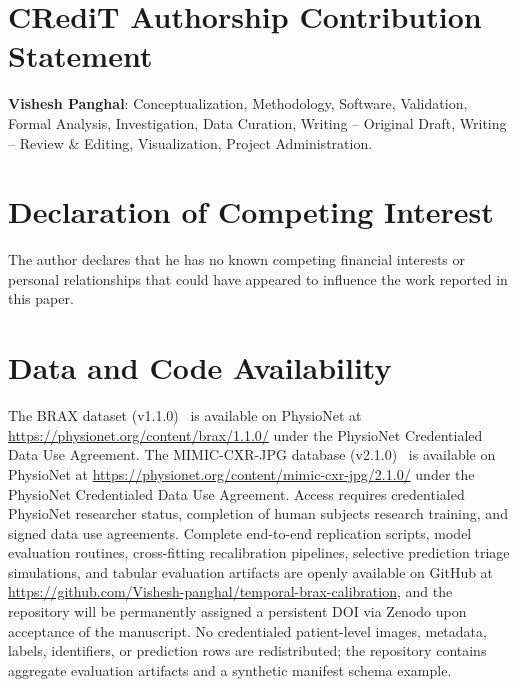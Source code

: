 \documentclass[preprint,12pt]{elsarticle}
\begin{document}
\section*{CRediT Authorship Contribution Statement}
\textbf{Vishesh Panghal}: Conceptualization, Methodology, Software, Validation, Formal Analysis, Investigation, Data Curation, Writing -- Original Draft, Writing -- Review \& Editing, Visualization, Project Administration.

\section*{Declaration of Competing Interest}
The author declares that he has no known competing financial interests or personal relationships that could have appeared to influence the work reported in this paper.

\section*{Data and Code Availability}
The BRAX dataset (v1.1.0)~\cite{reis2022brax} is available on PhysioNet at \url{https://physionet.org/content/brax/1.1.0/} under the PhysioNet Credentialed Data Use Agreement. The MIMIC-CXR-JPG database (v2.1.0)~\cite{johnson2019mimic,johnson2019mimicjpg} is available on PhysioNet at \url{https://physionet.org/content/mimic-cxr-jpg/2.1.0/} under the PhysioNet Credentialed Data Use Agreement. Access requires credentialed PhysioNet researcher status, completion of human subjects research training, and signed data use agreements. Complete end-to-end replication scripts, model evaluation routines, cross-fitting recalibration pipelines, selective prediction triage simulations, and tabular evaluation artifacts are openly available on GitHub at \url{https://github.com/Vishesh-panghal/temporal-brax-calibration}, and the repository will be permanently assigned a persistent DOI via Zenodo upon acceptance of the manuscript. No credentialed patient-level images, metadata, labels, identifiers, or prediction rows are redistributed; the repository contains aggregate evaluation artifacts and a synthetic manifest schema example.
\end{document}
